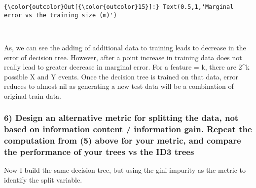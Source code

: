 \documentclass[11pt]{article}
\begin{document}
\begin{Verbatim}[commandchars=\\\{\}]
{\color{outcolor}Out[{\color{outcolor}15}]:} Text(0.5,1,'Marginal error vs the training size (m)')
\end{Verbatim}
            
    \begin{center}
    \end{center}
    { \hspace*{\fill} \\}
    
    As, we can see the adding of additional data to training leads to
decrease in the error of decision tree. However, after a point increase
in training data does not really lead to greater decrease in marginal
error. For a feature = k, there are 2\^{}k possible X and Y events. Once
the decision tree is trained on that data, error reduces to almost nil
as generating a new test data will be a combination of original train
data.

    \subsubsection{6) Design an alternative metric for splitting the data,
not based on information content / information gain. Repeat the
computation from (5) above for your metric, and compare the performance
of your trees vs the ID3
trees}\label{design-an-alternative-metric-for-splitting-the-data-not-based-on-information-content-information-gain.-repeat-the-computation-from-5-above-for-your-metric-and-compare-the-performance-of-your-trees-vs-the-id3-trees}

    Now I build the same decision tree, but using the gini-impurity as the
metric to identify the split variable.
\end{document}
